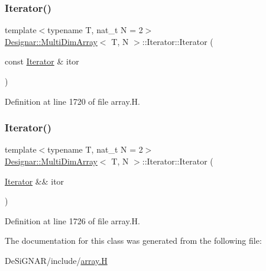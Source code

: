 \mbox{\label{class_designar_1_1_multi_dim_array_1_1_iterator_a2d0c217ae08b2203c50e1d1a01c3af40}} 
\subsubsection{\texorpdfstring{Iterator()}{Iterator()}\hspace{0.1cm}{\footnotesize\ttfamily [4/5]}}
{\footnotesize\ttfamily template$<$typename T, nat\+\_\+t N = 2$>$ \\
\hyperlink{class_designar_1_1_multi_dim_array}{Designar\+::\+Multi\+Dim\+Array}$<$ T, N $>$\+::Iterator\+::\+Iterator (\begin{DoxyParamCaption}\item[{const \hyperlink{class_designar_1_1_multi_dim_array_1_1_iterator}{Iterator} \&}]{itor }\end{DoxyParamCaption})\hspace{0.3cm}{\ttfamily [inline]}}



Definition at line 1720 of file array.\+H.

\mbox{\label{class_designar_1_1_multi_dim_array_1_1_iterator_af6ebf97caae786b50dcb6062b3ab7b0b}} 
\subsubsection{\texorpdfstring{Iterator()}{Iterator()}\hspace{0.1cm}{\footnotesize\ttfamily [5/5]}}
{\footnotesize\ttfamily template$<$typename T, nat\+\_\+t N = 2$>$ \\
\hyperlink{class_designar_1_1_multi_dim_array}{Designar\+::\+Multi\+Dim\+Array}$<$ T, N $>$\+::Iterator\+::\+Iterator (\begin{DoxyParamCaption}\item[{\hyperlink{class_designar_1_1_multi_dim_array_1_1_iterator}{Iterator} \&\&}]{itor }\end{DoxyParamCaption})\hspace{0.3cm}{\ttfamily [inline]}}



Definition at line 1726 of file array.\+H.



The documentation for this class was generated from the following file\+:\begin{DoxyCompactItemize}
\item 
De\+Si\+G\+N\+A\+R/include/\hyperlink{array_8_h}{array.\+H}\end{DoxyCompactItemize}
